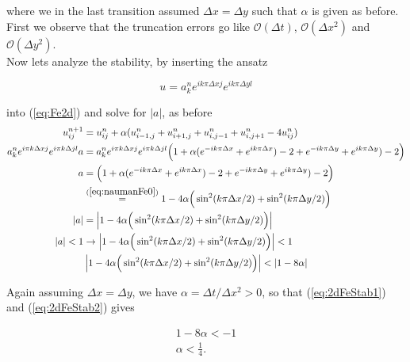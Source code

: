 \documentclass{article}
\begin{document}
where we in the last transition assumed $\Delta x = \Delta y$ such that $\alpha$ is given as before.\\

First we observe that the truncation errors go like $\mathcal{O}(\Delta t)$, $\mathcal{O}(\Delta x^2)$ and $\mathcal{O}(\Delta y^2)$.\\

Now lets analyze the stability, by inserting the ansatz

\begin{equation}\label{eq:ansatz2d}
	u = a_k^n e^{i k \pi \Delta x j} e^{i k \pi \Delta y l}
\end{equation}

into (\ref{eq:Fe2d}) and solve for $|a|$, as before\\

\begin{subequations}
	\begin{align}
		u_{ij}^{n+1} &= u_{ij}^{n} + \alpha (u_{i-1,j}^n + u_{i+1,j}^n + u_{i,j-1}^n + u_{i,j+1}^n - 4u_{ij}^n)\\
		a_k^n e^{i \pi k \Delta x j} e^{i \pi k \Delta j l} a&= 
		a_k^n e^{i \pi k \Delta x j} e^{i \pi k \Delta j l} 
		\Big(1 + \alpha(e^{-i k \pi \Delta x} + e^{i k \pi \Delta x})  - 2 + e^{-i k \pi \Delta y} + e^{i k \pi \Delta y})  - 2\Big)\\
		a&= 
		\Big(1 + \alpha(e^{-i k \pi \Delta x} + e^{i k \pi \Delta x})  - 2 + e^{-i k \pi \Delta y} + e^{i k \pi \Delta y})  - 2\Big)\\
		&\stackrel{(\ref{eq:naumanFe0})}{=}
		1 - 4 \alpha \Big(\sin^2 (k \pi \Delta x /2) + \sin^2(k \pi \Delta y/2)\Big)\\
		|a| &=
		\left|1 - 4 \alpha \Big(\sin^2 (k \pi \Delta x /2) + \sin^2(k \pi \Delta y/2)\Big)\right|\\
		|a| < 1 &\rightarrow 		\left|1 - 4 \alpha \Big(\sin^2 (k \pi \Delta x /2) + \sin^2(k \pi \Delta y/2)\Big)\right|  < 1\label{eq:2dFeStab1}\\
		&\left|1 - 4 \alpha \Big(\sin^2 (k \pi \Delta x /2) + \sin^2(k \pi \Delta y/2)\Big)\right| < \left|1 - 8 \alpha \right|\label{eq:2dFeStab2}
	\end{align}
\end{subequations}

Again assuming $\Delta x = \Delta y$, we have $\alpha = \Delta t/\Delta x^2 > 0$, so that (\ref{eq:2dFeStab1}) and (\ref{eq:2dFeStab2}) gives

\begin{subequations}
	\begin{align}
		1 - 8 \alpha < -1\\
		\alpha < \frac{1}{4}.\label{eq:2dFeStab}
	\end{align}
\end{subequations}
\end{document}
